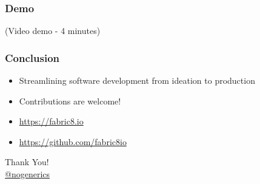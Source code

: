 \documentclass[aspectratio=169]{beamer}
\begin{document}
\begin{frame}
  \frametitle{Demo}

  (Video demo - 4 minutes)

\end{frame}

\begin{frame}
  \frametitle{Conclusion}

\begin{itemize}
  \item<1-> Streamlining software development from ideation to production
  \item<2-> Contributions are welcome!
  \item<3-> \url{https://fabric8.io}
  \item<3-> \url{https://github.com/fabric8io}
\end{itemize}
\end{frame}

\begin{frame}%
\begin{center}
{\huge Thank You!}\\[1cm]
{\large \href{https://twitter.com/nogenerics}{@nogenerics}}
\end{center}
\end{frame}
\end{document}
